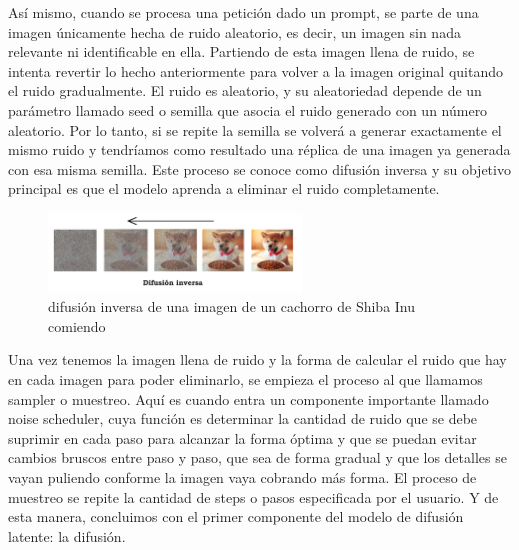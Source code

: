Así mismo, cuando se procesa una petición dado un prompt, se parte de una imagen únicamente hecha de ruido aleatorio, es decir, un imagen sin nada relevante ni identificable en ella. Partiendo de esta imagen llena de ruido, se intenta revertir lo hecho anteriormente para volver a la imagen original quitando el ruido gradualmente. El ruido es aleatorio, y su aleatoriedad depende de un parámetro llamado seed o semilla que asocia el ruido generado con un número aleatorio. Por lo tanto, si se repite la semilla se volverá a generar exactamente el mismo ruido y tendríamos como resultado una réplica de una imagen ya generada con esa misma semilla. Este proceso se conoce como difusión inversa y su objetivo principal es que el modelo aprenda a eliminar el ruido completamente. \\

\begin{figure}[h]
	\centering
	\includegraphics[width = 0.6\textwidth]{Imagenes/Vectorial/difusioninversa.png}
	\caption{difusión inversa de una imagen de un cachorro de Shiba Inu comiendo}
	\label{fig:sampleImage}
\end{figure}

Una vez tenemos la imagen llena de ruido y la forma de calcular el ruido que hay en cada imagen para poder eliminarlo, se empieza el proceso al que llamamos sampler o muestreo. Aquí es cuando entra un componente importante llamado noise scheduler, cuya función es determinar la cantidad de ruido que se debe suprimir en cada paso para alcanzar la forma óptima y que se puedan evitar cambios bruscos entre paso y paso, que sea de forma gradual y que los detalles se vayan puliendo conforme la imagen vaya cobrando más forma. El proceso de muestreo se repite la cantidad de steps o pasos especificada por el usuario. Y de esta manera, concluimos con el primer componente del modelo de difusión latente: la difusión.\\ 

